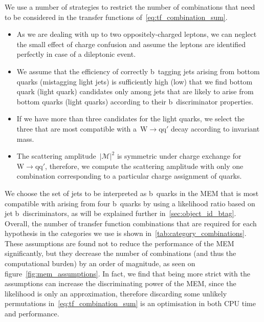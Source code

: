 We use a number of strategies to restrict the number of combinations that need to be considered in the transfer functions of~\cref{eq:tf_combination_sum}. 

\begin{itemize}
\item As we are dealing with up to two oppositely-charged leptons, we can neglect the small effect of charge confusion and assume the leptons are identified perfectly in case of a dileptonic event.
\item We assume that the efficiency of correctly b~tagging jets arising from bottom quarks (mistagging light jets) is sufficiently high (low) that we find bottom quark (light quark) candidates only among jets that are likely to arise from bottom quarks (light quarks) according to their b~discriminator properties.
\item If we have more than three candidates for the light quarks, we select the three that are most compatible with a~$\mathrm{W} \rightarrow \mathrm{q}\mathrm{q}'$ decay according to invariant mass.
\item The scattering amplitude~$|\mathcal{M}|^2$ is symmetric under charge exchange for $\mathrm{W} \rightarrow \mathrm{qq'}$, therefore, we compute the scattering amplitude with only one combination corresponding to a particular charge assignment of quarks.
\end{itemize}

We choose the set of jets to be interpreted as b~quarks in the MEM that is most compatible with arising from four b~quarks by using a likelihood ratio based on jet b~discriminators, as will be explained further in~\cref{sec:object_id_btag}. Overall, the number of transfer function combinations that are required for each hypothesis in the categories we use is shown in~\cref{tab:category_combinations}. These assumptions are found not to reduce the performance of the MEM significantly, but they decrease the number of combinations (and thus the computational burden) by an order of magnitude, as seen on figure~\cref{fig:mem_assumptions}. In fact, we find that being more strict with the assumptions can increase the discriminating power of the MEM, since the likelihood is only an approximation, therefore discarding some unlikely permutations in~\cref{eq:tf_combination_sum} is an optimisation in both CPU time and performance.

